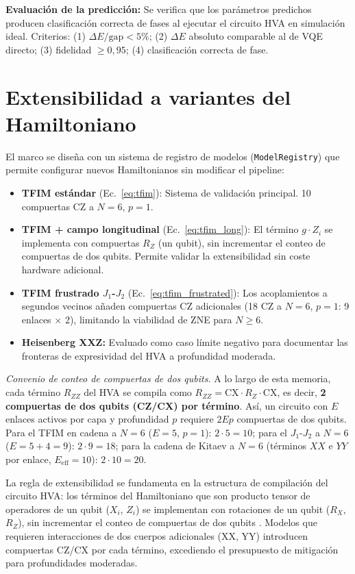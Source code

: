\documentclass[11pt,a4paper,spanish]{book}
\begin{document}
\textbf{Evaluación de la predicción:} Se verifica que los parámetros predichos producen clasificación correcta de fases al ejecutar el circuito HVA en simulación ideal. Criterios: (1) $\Delta E/\text{gap} < 5\%$; (2) $\Delta E$ absoluto comparable al de VQE directo; (3) fidelidad $\geq 0,95$; (4) clasificación correcta de fase.

\section{Extensibilidad a variantes del Hamiltoniano}
\label{sec:extensibilidad_dev}

El marco se diseña con un sistema de registro de modelos (\texttt{ModelRegistry}) que permite configurar nuevos Hamiltonianos sin modificar el pipeline:

\begin{itemize}
    \item \textbf{TFIM estándar} (Ec.~\ref{eq:tfim}): Sistema de validación principal. 10 compuertas CZ a $N = 6$, $p = 1$.
    \item \textbf{TFIM + campo longitudinal} (Ec.~\ref{eq:tfim_long}): El término $g \cdot Z_i$ se implementa con compuertas $R_Z$ (un qubit), sin incrementar el conteo de compuertas de dos qubits. Permite validar la extensibilidad sin coste hardware adicional.
    \item \textbf{TFIM frustrado $J_1$-$J_2$} (Ec.~\ref{eq:tfim_frustrated}): Los acoplamientos a segundos vecinos añaden compuertas CZ adicionales (18 CZ a $N = 6$, $p = 1$: 9 enlaces $\times$ 2), limitando la viabilidad de ZNE para $N \geq 6$.
    \item \textbf{Heisenberg XXZ:} Evaluado como caso límite negativo para documentar las fronteras de expresividad del HVA a profundidad moderada.
\end{itemize}

\noindent\textit{Convenio de conteo de compuertas de dos qubits.} A lo largo de esta memoria, cada término $R_{ZZ}$ del HVA se compila como $R_{ZZ} = \text{CX} \cdot R_Z \cdot \text{CX}$, es decir, \textbf{2 compuertas de dos qubits (CZ/CX) por término}. Así, un circuito con $E$ enlaces activos por capa y profundidad $p$ requiere $2Ep$ compuertas de dos qubits. Para el TFIM en cadena a $N = 6$ ($E = 5$, $p = 1$): $2 \cdot 5 = 10$; para el $J_1$-$J_2$ a $N = 6$ ($E = 5 + 4 = 9$): $2 \cdot 9 = 18$; para la cadena de Kitaev a $N = 6$ (términos $XX$ e $YY$ por enlace, $E_{\text{eff}} = 10$): $2 \cdot 10 = 20$.

La regla de extensibilidad se fundamenta en la estructura de compilación del circuito HVA: los términos del Hamiltoniano que son producto tensor de operadores de un qubit ($X_i$, $Z_i$) se implementan con rotaciones de un qubit ($R_X$, $R_Z$), sin incrementar el conteo de compuertas de dos qubits \citep{wiersema2020}. Modelos que requieren interacciones de dos cuerpos adicionales (XX, YY) introducen compuertas CZ/CX por cada término, excediendo el presupuesto de mitigación para profundidades moderadas.
\end{document}
